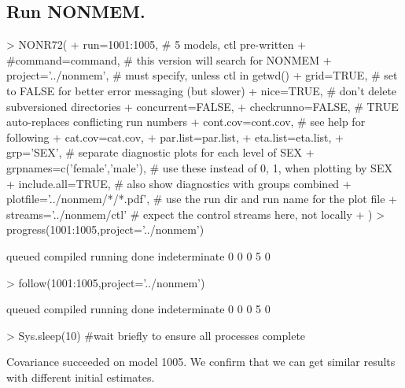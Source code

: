 \subsection{Run NONMEM.}
\begin{Schunk}
\begin{Sinput}
> NONR72(
+      run=1001:1005,                       # 5 models, ctl pre-written
+      #command=command,                    # this version will search for NONMEM
+      project='../nonmem',                 # must specify, unless ctl in getwd()
+      grid=TRUE,                          # set to FALSE for better error messaging (but slower)
+      nice=TRUE,                           # don't delete subversioned directories
+      concurrent=FALSE,
+      checkrunno=FALSE,                    # TRUE auto-replaces conflicting run numbers
+      cont.cov=cont.cov,                   # see help for following
+      cat.cov=cat.cov,
+      par.list=par.list,
+      eta.list=eta.list,
+      grp='SEX',                           # separate diagnostic plots for each level of SEX
+      grpnames=c('female','male'),         # use these instead of 0, 1, when plotting by SEX
+      include.all=TRUE,                    # also show diagnostics with groups combined
+      plotfile='../nonmem/*/*.pdf',        # use the run dir and run name for the plot file 
+      streams='../nonmem/ctl'              # expect the control streams here, not locally
+ )
> progress(1001:1005,project='../nonmem')
\end{Sinput}
\begin{Soutput}
       queued      compiled       running          done indeterminate 
            0             0             0             5             0 
\end{Soutput}
\begin{Sinput}
> follow(1001:1005,project='../nonmem')
\end{Sinput}
\begin{Soutput}
       queued      compiled       running          done indeterminate 
            0             0             0             5             0 
\end{Soutput}
\begin{Sinput}
> Sys.sleep(10)                             #wait briefly to ensure all processes complete
\end{Sinput}
\end{Schunk}
Covariance succeeded on model 1005.
We confirm that we can get similar results with different initial estimates.
